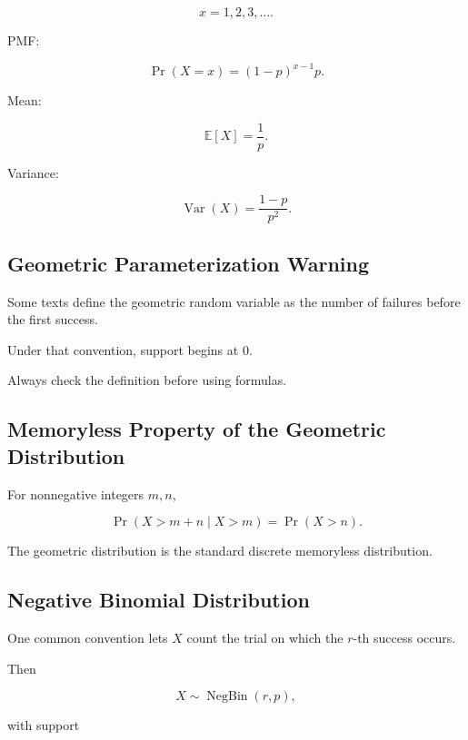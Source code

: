 \[
\boxed{
x=1,2,3,\ldots.
}
\]

PMF:

\[
\boxed{
\Pr(X=x)
=
(1-p)^{x-1}p.
}
\]

Mean:

\[
\boxed{
\mathbb{E}[X]
=
\frac1p.
}
\]

Variance:

\[
\boxed{
\operatorname{Var}(X)
=
\frac{1-p}{p^2}.
}
\]

\subsection{Geometric Parameterization Warning}
\label{subsec:geometric-parameterization-warning}

Some texts define the geometric random variable as the number of failures
before the first success.

Under that convention, support begins at \(0\).

Always check the definition before using formulas.

\subsection{Memoryless Property of the Geometric Distribution}
\label{subsec:geometric-memoryless}

For nonnegative integers \(m,n\),

\[
\boxed{
\Pr(X>m+n\mid X>m)
=
\Pr(X>n).
}
\]

The geometric distribution is the standard discrete memoryless distribution.

\subsection{Negative Binomial Distribution}
\label{subsec:negative-binomial-reference}

One common convention lets \(X\) count the trial on which the \(r\)-th
success occurs.

Then

\[
\boxed{
X\sim\operatorname{NegBin}(r,p),
}
\]

with support

